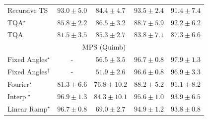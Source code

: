 \begin{tabular}{l|cccc|}
Recursive TS & {\cellcolor[HTML]{790D75}} \color[HTML]{F1F1F1} $93.0\pm 5.0$ & {\cellcolor[HTML]{8950A4}} \color[HTML]{F1F1F1} $84.4\pm 4.7$ & {\cellcolor[HTML]{740B70}} \color[HTML]{F1F1F1} $93.5\pm 2.4$ & {\cellcolor[HTML]{821580}} \color[HTML]{F1F1F1} $91.4\pm 7.4$ \\
TQA$^\star$ & {\cellcolor[HTML]{88459F}} \color[HTML]{F1F1F1} $85.8\pm 2.2$ & {\cellcolor[HTML]{88409C}} \color[HTML]{F1F1F1} $86.5\pm 3.2$ & {\cellcolor[HTML]{852D90}} \color[HTML]{F1F1F1} $88.7\pm 5.9$ & {\cellcolor[HTML]{810F7C}} \color[HTML]{F1F1F1} $92.2\pm 6.2$ \\
TQA & {\cellcolor[HTML]{8B65AE}} \color[HTML]{F1F1F1} $81.5\pm 3.5$ & {\cellcolor[HTML]{8949A1}} \color[HTML]{F1F1F1} $85.3\pm 2.7$ & {\cellcolor[HTML]{8A54A6}} \color[HTML]{F1F1F1} $83.8\pm 7.1$ & {\cellcolor[HTML]{873A98}} \color[HTML]{F1F1F1} $87.3\pm 6.6$ \\
\cline{1-5}
\multicolumn{5}{c}{\rule{0pt}{8pt}MPS (Quimb)} \\
\midrule
Fixed Angles$^\star$ & {\cellcolor[HTML]{000000}} \color[HTML]{F1F1F1} {\cellcolor{white}} \color{black} - & {\cellcolor[HTML]{FFF9C5}} \color[HTML]{000000} $56.5\pm 3.5$ & {\cellcolor[HTML]{712806}} \color[HTML]{F1F1F1} $96.7\pm 0.8$ & {\cellcolor[HTML]{662506}} \color[HTML]{F1F1F1} $97.9\pm 1.3$ \\
Fixed Angles$^\dagger$ & {\cellcolor[HTML]{000000}} \color[HTML]{F1F1F1} {\cellcolor{white}} \color{black} - & {\cellcolor[HTML]{FFFFE5}} \color[HTML]{000000} $51.9\pm 2.6$ & {\cellcolor[HTML]{712806}} \color[HTML]{F1F1F1} $96.6\pm 0.8$ & {\cellcolor[HTML]{702806}} \color[HTML]{F1F1F1} $96.9\pm 3.3$ \\
Fourier$^\star$ & {\cellcolor[HTML]{E86C12}} \color[HTML]{F1F1F1} $81.3\pm 6.6$ & {\cellcolor[HTML]{F88B22}} \color[HTML]{F1F1F1} $76.8\pm 10.2$ & {\cellcolor[HTML]{BC4503}} \color[HTML]{F1F1F1} $88.2\pm 5.2$ & {\cellcolor[HTML]{A33904}} \color[HTML]{F1F1F1} $91.1\pm 8.2$ \\
Interp.$^\star$ & {\cellcolor[HTML]{702806}} \color[HTML]{F1F1F1} $96.9\pm 1.3$ & {\cellcolor[HTML]{D85A09}} \color[HTML]{F1F1F1} $84.3\pm 10.1$ & {\cellcolor[HTML]{7B2B05}} \color[HTML]{F1F1F1} $95.6\pm 1.0$ & {\cellcolor[HTML]{892F05}} \color[HTML]{F1F1F1} $93.9\pm 6.5$ \\
Linear Ramp$^\star$ & {\cellcolor[HTML]{712806}} \color[HTML]{F1F1F1} $96.7\pm 0.8$ & {\cellcolor[HTML]{FEC652}} \color[HTML]{000000} $69.0\pm 2.7$ & {\cellcolor[HTML]{812D05}} \color[HTML]{F1F1F1} $94.9\pm 1.2$ & {\cellcolor[HTML]{8B3005}} \color[HTML]{F1F1F1} $93.8\pm 0.8$ \\

\end{tabular}
